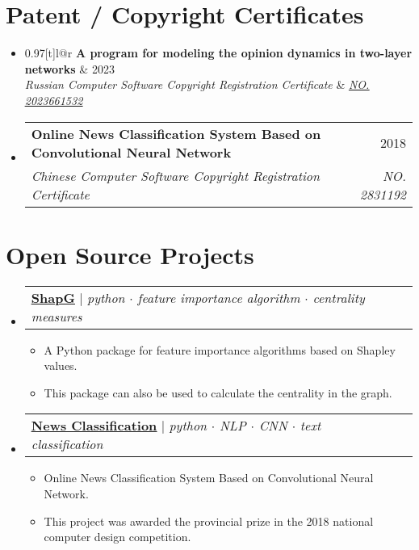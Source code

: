 \documentclass[letterpaper,10pt]{article}
\makeatletter
\newcommand{\link}[2]{\href{#1}{\color{blue}\underline{#2}}}
\newcommand{\resumeItem}[1]{
  \item\small{
    {#1 \vspace{-2pt}}
  }
}
\newcommand{\resumeSubheading}[4]{
  \vspace{-2pt}\item
  \begin{tabular*}{0.97\textwidth}[t]{l@{\extracolsep{\fill}}r}
    \textbf{#1} & #2 \\
    \textit{\small#3} & \textit{\small #4} \\
  \end{tabular*}\vspace{-7pt}
}
\newcommand{\resumeSubSubheading}[2]{
  \item
  \begin{tabular*}{0.97\textwidth}{l@{\extracolsep{\fill}}r}
    \textit{\small#1} & \textit{\small #2} \\
  \end{tabular*}\vspace{-7pt}
}
\newcommand{\resumeProjectHeading}[2]{
  \item
  \begin{tabular*}{0.97\textwidth}{l@{\extracolsep{\fill}}r}
    \small#1 & #2 \\
  \end{tabular*}\vspace{-7pt}
}
\newenvironment{resumeSubHeadingList}{\begin{itemize}[leftmargin=0.15in, label={}]}{\end{itemize}}
\newenvironment{resumeItemList}{\begin{itemize}}{\end{itemize}}
\makeatother
\begin{document}
\begin{resumeSubHeadingList}
\end{resumeSubHeadingList}

\newpage
\section{Patent / Copyright Certificates}
\begin{resumeSubHeadingList}
  \resumeSubheading
    {A program for modeling the opinion dynamics in two-layer networks}{2023}
    {Russian Computer Software Copyright Registration Certificate}{{\link{https://new.fips.ru/registers-doc-view/fips_servlet?DB=EVM&DocNumber=2023661532&TypeFile=html}{NO. 2023661532}}}
  \resumeSubheading
    {Online News Classification System Based on Convolutional Neural Network}{2018}
    {Chinese Computer Software Copyright Registration Certificate}{NO. 2831192}
\end{resumeSubHeadingList}

\section{Open Source Projects}
\begin{resumeSubHeadingList}

  \resumeProjectHeading{
    \link{https://github.com/vectorsss/shapG}{\textbf{ShapG}} $|$
    \emph{python $\cdot$ feature importance algorithm $\cdot$ centrality
          measures}}{}
  \begin{resumeItemList}
    \resumeItem{A Python package for feature importance algorithms based on
                Shapley values.}
    \resumeItem{This package can also be used to calculate the centrality in
                the graph.}
  \end{resumeItemList}
  \resumeProjectHeading{
    \link{https://github.com/vectorsss/news_classification}{\textbf{News
        Classification}} $|$
    \emph{python $\cdot$ NLP $\cdot$ CNN $\cdot$ text classification}}{}
  \begin{resumeItemList}
    \resumeItem{Online News Classification System Based on Convolutional Neural
                Network.}
    \resumeItem{This project was awarded the provincial  prize in the
                2018 national computer design competition.}
  \end{resumeItemList}
\end{resumeSubHeadingList}
\end{document}
